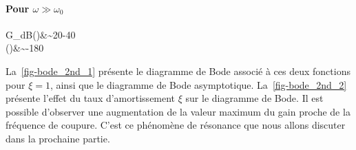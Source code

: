 \paragraph{Pour $\omega \gg\omega_0$}
\begin{bequation}
G_{dB}(\omega)&\sim20-40\log\omega\\
\phi(\omega)&\sim-180\degree
\end{bequation}
La~\cref{fig-bode_2nd_1} présente le diagramme de Bode associé à ces deux fonctions pour $\xi=1$, ainsi que le
diagramme de Bode asymptotique. La~\cref{fig-bode_2nd_2} présente l'effet du taux d'amortissement $\xi$ sur le diagramme 
de Bode. Il est possible d'observer une augmentation de la valeur maximum du gain proche de la fréquence de coupure.
C'est ce phénomène de résonance que nous allons discuter dans la prochaine partie.


